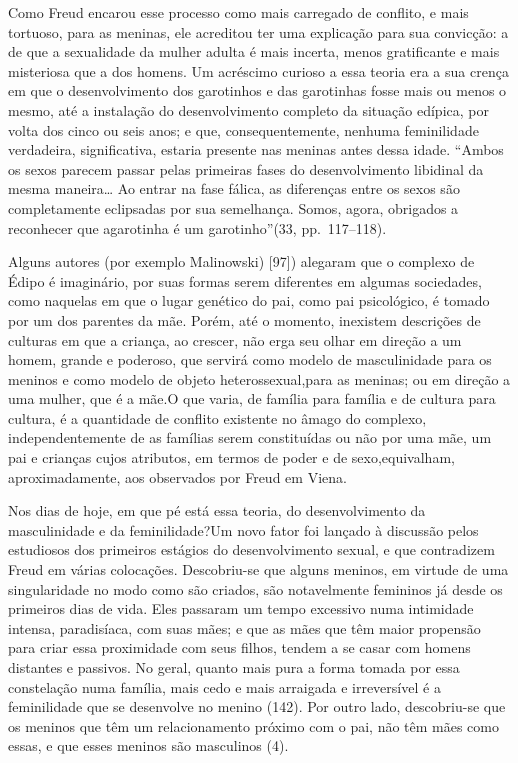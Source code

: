  Como Freud encarou esse processo como mais carregado de conflito, e
mais tortuoso, para as meninas, ele acreditou ter uma explicação para
sua convicção: a de que a sexualidade da mulher adulta é mais incerta,
menos gratificante e mais misteriosa que a dos homens. Um acréscimo
curioso a essa teoria era a sua crença em que o desenvolvimento dos
garotinhos e das garotinhas fosse mais ou menos o mesmo, até a
instalação do desenvolvimento completo da situação edípica, por volta
dos cinco ou seis anos; e que, consequentemente, nenhuma feminilidade
verdadeira, significativa, estaria presente nas meninas antes dessa
idade. ``Ambos os sexos parecem passar pelas primeiras
fases do desenvolvimento libidinal da mesma maneira\ldots{} Ao entrar na
fase fálica,\idxfasef{} as diferenças entre os sexos são completamente eclipsadas
por sua semelhança. Somos, agora, obrigados a reconhecer que a\idxconfemeni[|)]
garotinha é um garotinho''\idxfreudedipo[|)] (33, pp.~117--118).

 Alguns autores (por exemplo\idxmalino{} Malinowski) [97]) alegaram que o complexo
de Édipo é imaginário, por suas formas serem diferentes em algumas
sociedades, como naquelas em que o lugar genético do pai, como pai
psicológico, é tomado por um dos parentes da mãe. Porém, até o momento,
inexistem descrições de culturas\idxrelaconf{} em que a criança,\idxconfeestu{} ao crescer, não erga
seu olhar em direção a um homem, grande e poderoso, que servirá como
modelo de masculinidade\idxpaismasc{} para os meninos e como modelo de objeto
heterossexual,\idxconfehete[|)] para as meninas; ou em direção a uma mulher, que é a
mãe.\idxfeminsimb[|(] O que varia, de família para família e de cultura para cultura, é
a quantidade de conflito existente no âmago do complexo,
independentemente de as famílias serem constituídas ou não por uma mãe,
 um pai e crianças cujos atributos, em termos de poder e de sexo,\idxheteroconf[|)]
equivalham, aproximadamente, aos observados por Freud em Viena.

 Nos dias de hoje, em que pé está essa teoria, do desenvolvimento da
masculinidade e da feminilidade?\idxmaesdese[|(] Um novo fator foi lançado à discussão
pelos estudiosos dos primeiros estágios do desenvolvimento sexual, e
que contradizem Freud em várias colocações. Descobriu-se que alguns
meninos, em virtude de uma singularidade no modo como são criados, são
notavelmente femininos já desde os primeiros dias de vida. Eles
passaram um tempo excessivo numa intimidade intensa, paradisíaca, com
suas mães; e que as mães que têm maior propensão para criar essa
proximidade com seus filhos, tendem a se casar com homens distantes e
passivos. No geral, quanto mais pura a forma tomada por essa
constelação numa família, mais cedo e mais arraigada e irreversível é a
feminilidade que se desenvolve no menino (142). Por outro lado,
descobriu-se que os meninos que têm um relacionamento próximo com o
pai, não têm mães como essas, e que esses meninos são masculinos (4).

